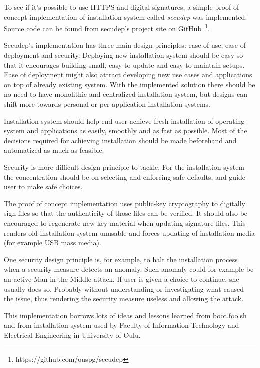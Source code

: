 
To see if it's possible to use HTTPS and digital signatures, a simple
proof of concept implementation of installation system
called \emph{secudep} was implemented. Source code can be found from
secudep's project site on
GitHub~\footnote{https://github.com/ouspg/secudep}.

Secudep's implementation has three main design principles: ease of
use, ease of deployment and security. Deploying new installation
system should be easy so that it encourages building small, easy to
update and easy to maintain setups. Ease of deployment might also
attract developing new use cases and applications on top of already
existing system. With the implemented solution there should be no need
to have monolithic and centralized installation system, but designs
can shift more towards personal or per application installation
systems.

Installation system should help end user achieve fresh installation of
operating system and applications as easily, smoothly and as fast as
possible. Most of the decisions required for achieving installation
should be made beforehand and automatized as much as feasible.

Security is more difficult design principle to tackle. For the
installation system the concentration should be on selecting and
enforcing safe defaults, and guide user to make safe choices.

The proof of concept implementation uses public-key cryptography to
digitally sign files so that the authenticity of those files can be
verified. It should also be encouraged to regenerate new key material
when updating signature files. This renders old installation system
unusable and forces updating of installation media (for example USB
mass media).

One security design principle is, for example, to halt the
installation process when a security measure detects an anomaly. Such
anomaly could for example be an active Man-in-the-Middle attack. If
user is given a choice to continue, she usually does so. Probably
without understanding or investigating what caused the issue, thus
rendering the security measure useless and allowing the attack.

This implementation borrows lots of ideas and lessons learned from
boot.foo.sh~\cite{boot-foo-sh} and from installation system
used by Faculty of Information Technology and Electrical Engineering
in University of Oulu.

